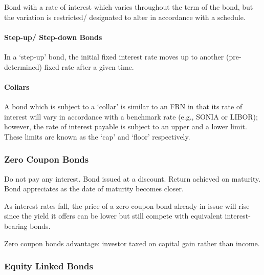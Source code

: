 \documentclass[
]{article}
\newenvironment{Shaded}{}{}
\newcommand{\NormalTok}[1]{#1}
\begin{document}
Bond with a rate of interest which varies throughout the term of the
bond, but the variation is restricted/ designated to alter in accordance
with a schedule.

\hypertarget{step-up-step-down-bonds}{%
\paragraph{Step-up/ Step-down Bonds}\label{step-up-step-down-bonds}}

In a `step-up' bond, the initial fixed interest rate moves up to another
(pre-determined) fixed rate after a given time.

\hypertarget{collars}{%
\paragraph{Collars}\label{collars}}

A bond which is subject to a `collar' is similar to an FRN in that its
rate of interest will vary in accordance with a benchmark rate (e.g.,
SONIA or LIBOR); however, the rate of interest payable is subject to an
upper and a lower limit. These limits are known as the `cap' and `floor'
respectively.

\hypertarget{zero-coupon-bonds}{%
\subsubsection{Zero Coupon Bonds}\label{zero-coupon-bonds}}

Do not pay any interest. Bond issued at a discount. Return achieved on
maturity. Bond appreciates as the date of maturity becomes closer.

\begin{Shaded}
\begin{Highlighting}[]
\NormalTok{As interest rates fall, the price of a zero coupon bond already in issue will rise since the yield it offers can be lower but still compete with equivalent interest{-}bearing bonds. }
\end{Highlighting}
\end{Shaded}

Zero coupon bonds advantage: investor taxed on capital gain rather than
income.

\hypertarget{equity-linked-bonds}{%
\subsubsection{Equity Linked Bonds}\label{equity-linked-bonds}}
\end{document}
